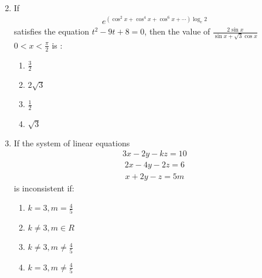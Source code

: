 \documentclass[journal,12pt,twocolumn]{IEEEtran}
\theoremstyle{remark}
\begin{document}
\begin{enumerate}
\begin{multicols}{2}
\end{multicols}
\bigskip
\item If 
\begin{align*}
    e^{\left(\cos^2{x} + \cos^4{x} + \cos^6{x} + \cdots \right) \log_e 2}
\end{align*} 
satisfies the equation $t^2-9t+8=0$, then the value of $\frac{2\sin{x}}{\sin{x}+\sqrt{3}\cos{x}}$ $0<x<\frac{\pi}{2}$ is :
\begin{multicols}{2}
\begin{enumerate}
    \item $\frac{3}{2}$
    \item $2\sqrt{3}$
    \item $\frac{1}{2}$
    \item $\sqrt{3}$
\end{enumerate}
\end{multicols}
\bigskip
\item If the system of linear equations
\begin{align*}
    3x-2y-kz=10
\end{align*}
\begin{align*}
    2x-4y-2z=6
\end{align*}
\begin{align*}
    x+2y-z=5m
\end{align*}
is inconsistent if:
\begin{multicols}{2}
\begin{enumerate}
    \item $k=3,m=\frac{4}{5}$
    \item $k\neq3,m\in R$
    \item $k\neq3,m\neq \frac{4}{5}$
    \item $k=3,m\neq \frac{4}{5}$
\end{enumerate}
\end{multicols}
\bigskip
\end{enumerate}
\end{document}
